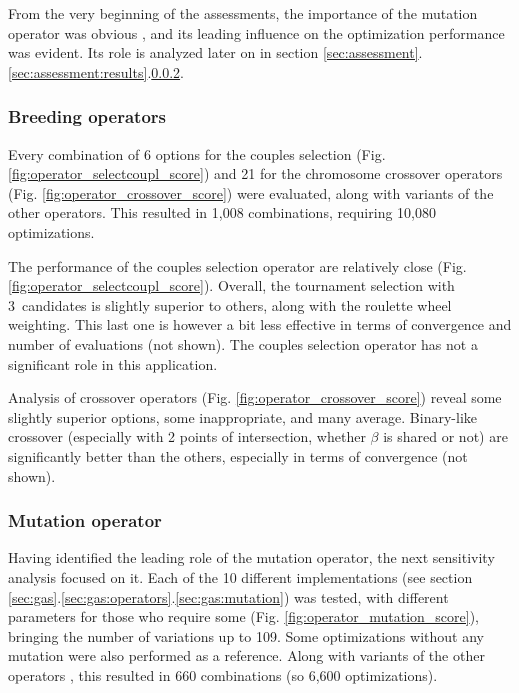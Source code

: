 \documentclass{ametsoc}
\begin{document}
From the very beginning of the assessments, the importance of the mutation operator was obvious \cite[see][for the details]{Horton2012a}, and its leading influence on the optimization performance was evident. Its role is analyzed later on in section \ref{sec:assessment}.\ref{sec:assessment:results}.\ref{sec:assessment:mutation}.

\subsubsection{Breeding operators}

Every combination of 6 options for the couples selection (Fig. \ref{fig:operator_selectcoupl_score}) and 21 for the chromosome crossover operators (Fig. \ref{fig:operator_crossover_score}) were evaluated, along with variants of the other operators. This resulted in 1,008 combinations, requiring 10,080 optimizations.

The performance of the couples selection operator are relatively close (Fig. \ref{fig:operator_selectcoupl_score}). Overall, the tournament selection with 3~candidates is slightly superior to others, along with the roulette wheel weighting. This last one is however a bit less effective in terms of convergence and number of evaluations (not shown). The couples selection operator has not a significant role in this application. 

Analysis of crossover operators (Fig. \ref{fig:operator_crossover_score}) reveal some slightly superior options, some inappropriate, and many average. Binary-like crossover (especially with 2 points of intersection, whether $\beta$ is shared or not) are significantly better than the others, especially in terms of convergence (not shown).
	

\subsubsection{Mutation operator}
\label{sec:assessment:mutation}

Having identified the leading role of the mutation operator, the next sensitivity analysis focused on it. Each of the 10 different implementations (see section \ref{sec:gas}.\ref{sec:gas:operators}.\ref{sec:gas:mutation}) was tested, with different parameters for those who require some (Fig. \ref{fig:operator_mutation_score}), bringing the number of variations up to 109. Some optimizations without any mutation were also performed as a reference. Along with variants of the other operators \citep[see][for the details]{Horton2012a}, this resulted in 660 combinations (so 6,600 optimizations).
\end{document}
